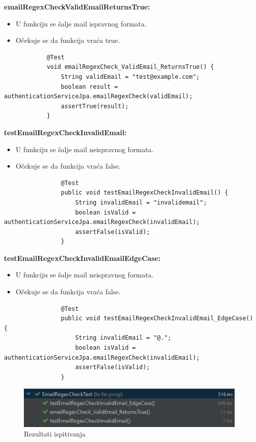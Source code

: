 			\textbf{emailRegexCheckValidEmailReturnsTrue:}
			\begin{itemize}
				\item U funkciju se šalje mail ispravnog formata.
				\item Očekuje se da funkcija vraća true.
			\end{itemize}
			\begin{lstlisting}
			@Test
			void emailRegexCheck_ValidEmail_ReturnsTrue() {
				String validEmail = "test@example.com";
				boolean result = authenticationServiceJpa.emailRegexCheck(validEmail);
				assertTrue(result);
			}
			\end{lstlisting}
			
			\textbf{testEmailRegexCheckInvalidEmail:}
			\begin{itemize}
				\item U funkciju se šalje mail neispravnog formata.
				\item Očekuje se da funkcija vraća false.
			\end{itemize}
			\begin{lstlisting}
				@Test
				public void testEmailRegexCheckInvalidEmail() {
					String invalidEmail = "invalidemail";
					boolean isValid = authenticationServiceJpa.emailRegexCheck(invalidEmail);
					assertFalse(isValid);
				}
			\end{lstlisting}
			
			\textbf{testEmailRegexCheckInvalidEmailEdgeCase:}
			\begin{itemize}
				\item U funkciju se šalje mail neispravnog formata.
				\item Očekuje se da funkcija vraća false.
			\end{itemize}
			\begin{lstlisting}
				@Test
				public void testEmailRegexCheckInvalidEmail_EdgeCase() {
					String invalidEmail = "@.";
					boolean isValid = authenticationServiceJpa.emailRegexCheck(invalidEmail);
					assertFalse(isValid);
				}
			\end{lstlisting}
			\begin{figure}[H]
				\includegraphics[scale=1]{slike/emailRegexTest.png} 
				\centering
				\caption{Rezultati ispitivanja}
				\label{fig:promjene}
			\end{figure}
			

